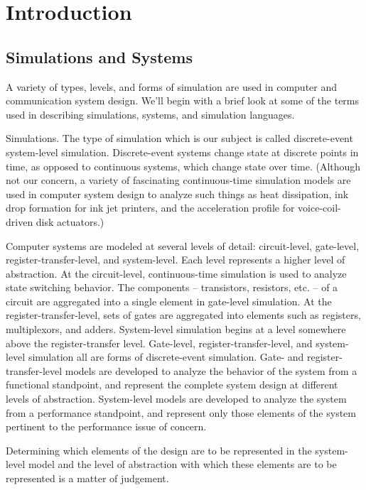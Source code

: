 \chapter{Introduction}
\label{chap:introduction}

\section{Simulations and Systems}
\label{sec:simulations-and-systems}

A variety of types, levels, and forms of simulation are used in computer and
communication system design. We'll begin with a brief look at some of the terms
used in describing simulations, systems, and simulation languages.

Simulations. The type of simulation which is our subject is called
discrete-event system-level simulation. Discrete-event systems change state at
discrete points in time, as opposed to continuous systems, which change state
over time. (Although not our concern, a variety of fascinating continuous-time
simulation models are used in computer system design to analyze such things as
heat dissipation, ink drop formation for ink jet printers, and the acceleration
profile for voice-coil-driven disk actuators.)

Computer systems are modeled at several levels of detail: circuit-level,
gate-level, register-transfer-level, and system-level. Each level represents a
higher level of abstraction. At the circuit-level, continuous-time simulation is
used to analyze state switching behavior. The components -- transistors,
resistors, etc. -- of a circuit are aggregated into a single element in
gate-level simulation. At the register-transfer-level, sets of gates are
aggregated into elements such as registers, multiplexors, and adders.
System-level simulation begins at a level somewhere above the register-transfer
level. Gate-level, register-transfer-level, and system-level simulation all are
forms of discrete-event simulation. Gate- and register-transfer-level models
are developed to analyze the behavior of the system from a functional
standpoint, and represent the complete system design at different levels of
abstraction. System-level models are developed to analyze the system from a
performance standpoint, and represent only those elements of the system
pertinent to the performance issue of concern.

Determining which elements of the design are to be represented in the
system-level model and the level of abstraction with which these elements are to
be represented is a matter of judgement.

